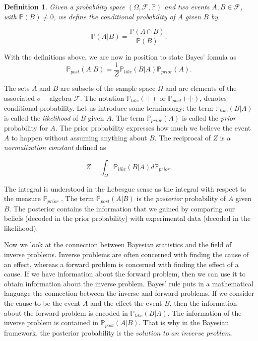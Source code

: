 \documentclass[12pt]{book}
\newtheorem{definition}{Definition}
\newcommand{\post}{\mathbb{P}_{post}}
\newcommand{\like}{\mathbb{P}_{like}}
\newcommand{\prior}{\mathbb{P}_{prior}}
\newcommand{\p}{\mathbb{P}}
\begin{document}
\begin{definition}
Given a probability space $(\Omega,\mathscr{F},\p)$ and two events $A,B\in\mathscr{F}$, with $\p(B)\neq 0$,
we define the conditional probability of $A$ given $B$ by

\begin{equation*}
\p(A|B)=\frac{\p(A\cap B)}{\p(B)}.
\end{equation*}
\end{definition}


With the definitions above, we are now in position to state Bayes' fomula as
\begin{equation}\label{eqnBayes}
\post(A|B)=\frac{1}{Z}\like(B|A)\prior(A).
\end{equation}


The sets $A$ and $B$ are subsets of the sample space $\Omega$ and 
are elements of the associated $\sigma-$algebra $\mathscr{F}$. The  notation
 $\like(\cdot|\cdot)$ or $\post(\cdot|\cdot)$, denotes conditional probability. Let us introduce some terminology:
 the term $\like(B|A)$ is called the \textit{likelihood} of $B$ given $A$. The term $\prior(A)$ is called the 
\textit{prior} probability for $A$. The prior probability expresses how much we believe the event $A$ 
to happen without assuming
anything about  $B$. The reciprocal of $Z$ is a \textit{normalization constant} defined as 

\begin{equation}\label{eqnNormalizationConstant}
Z=\int_{\Omega} \like(B|A)d\prior.
\end{equation}

The integral
is understood in the  Lebesgue sense as the  integral with respect to the measure $\prior$ \cite{lerner2014course}. 
The term $\post(A|B)$ is  the \textit{posterior} probability of $A$ given $B$. The posterior contains  the information 
that we gained by comparing our beliefs (decoded in the prior probability) with experimental data 
(decoded in the likelihood). 
\newline



Now we look at the connection between Bayesian statistics and  the field of inverse problems. 
Inverse problems are  often concerned with finding the cause of an effect, whereas a forward
problem is concerned with finding the effect of a cause. If we have information about the 
forward problem, then we can use it to obtain information about the inverse problem. Bayes' rule
puts in a mathematical language the connection between the inverse and forward problems. 
If we consider the cause to be the
event $A$ and the effect the event $B$, then the information about the forward problem
is encoded in $\like(B|A)$. The information of the inverse problem is contained in 
$\post(A|B)$. That is why in the Bayesian framework, the posterior probability
is the $\textit{solution to an inverse problem}$.
\end{document}
